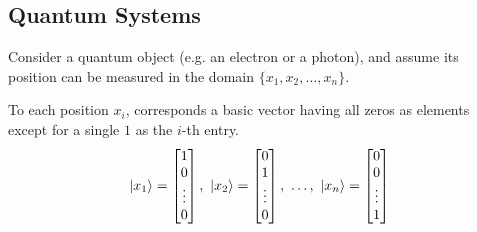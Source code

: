 \documentclass[12pt,a4paper]{report}
\theoremstyle{definition}
\theoremstyle{definition}
\theoremstyle{definition}
\begin{document}
\subsection{Quantum Systems}
Consider a quantum object (e.g. an electron or a photon), and assume its position can be measured in the domain $\{x_1, x_2, \ldots, x_n\}$.\\
\begin{center}
\end{center}
To each position $x_i$, corresponds a basic vector having all zeros as elements except for a single $1$ as the $i$-th entry.
\begin{equation*}
    \ket{x_1} = \begin{bmatrix}
        1\\
        0\\
        \vdots\\
        0\\
    \end{bmatrix},\ 
    \ket{x_2} = \begin{bmatrix}
        0\\
        1\\
        \vdots\\
        0\\
    \end{bmatrix},\ \ldots,\ 
    \ket{x_n} = \begin{bmatrix}
        0\\
        0\\
        \vdots\\
        1\\
    \end{bmatrix}
\end{equation*}
\end{document}

